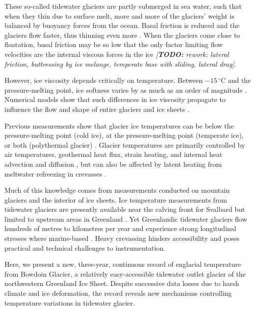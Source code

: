 \documentclass[utf8]{article}
\newcommand{\todo}[1]{\textcolor{c3}{\emph{[\textbf{TODO:} #1]}}}
\begin{document}
    These so-called tidewater glaciers are partly submerged in sea water, such
    that when they thin due to surface melt, more and more of the glaciers'
    weight is balanced by buoyancy forces from the ocean. Basal friction is
    reduced and the glaciers flow faster, thus thinning even more
    \citep{Meier.Post.1987}. When the glaciers come close to floatation, basal
    friction may be so low \citep{Shapero.etal.2016, Seddik.etal.2019} that the
    only factor limiting flow velocities are the internal viscous forces in
    the ice \todo{rework: lateral friction, buttressing by ice melange,
    temperate base with sliding, lateral drag}.

    However, ice viscosity depends critically on temperature. Between
    $-15\,^\circ$C and the pressure-melting point, ice softness varies by as
    much as an order of magnitude \citep[p.~72]{Cuffey.Paterson.2010}.
    Numerical models show that such differences
    in ice viscosity propagate to influence the flow and shape of entire
    glaciers and ice sheets \citep[e.g.,][Figs.~2 and~7]{Seguinot.etal.2016}.

    Previous measurements show that glacier ice temperatures can be below
    the pressure-melting point (cold ice), at the pressure-melting point
    (temperate ice), or both (polythermal glacier)
    \citep[p.~399]{Ahlmann.1935, Cuffey.Paterson.2010}. Glacier temperatures
    are primarily controlled by air temperatures, geothermal heat flux, strain
    heating, and internal heat advection and diffusion \citep{Q-Robin.1955},
    but can also be affected by latent heating from meltwater refreezing in
    crevasses \citep{Phillips.etal.2010, Phillips.etal.2013, Luthi.etal.2015}.

    Much of this knowledge comes from measurements conducted on mountain
    glaciers and the interior of ice sheets. Ice temperature measurements from
    tidewater glaciers are presently available near the calving front for
    Svalbard \citep{Jania.etal.1996} but limited to upstream areas in Greenland
    \citep{Iken.etal.1993, Luthi.etal.2002, Luthi.etal.2015, Doyle.etal.2018}.
    Yet Greenlandic tidewater glaciers flow hundreds of metres to kilometres
    per year and experience strong longitudinal stresses where marine-based
    \citep[e.g.,][]{Fastook.etal.1995}. Heavy
    crevassing hinders accessibility and poses practical and technical
    challenges to instrumentation.

    Here, we present a new, three-year, continuous record of englacial
    temperature from Bowdoin Glacier, a relatively easy-accessible tidewater
    outlet
    glacier of the northwestern Greenland Ice Sheet. Despite successive data
    losses due to harsh climate and ice deformation, the record reveals
    new mechanisms controlling temperature variations in tidewater glacier.
\end{document}
